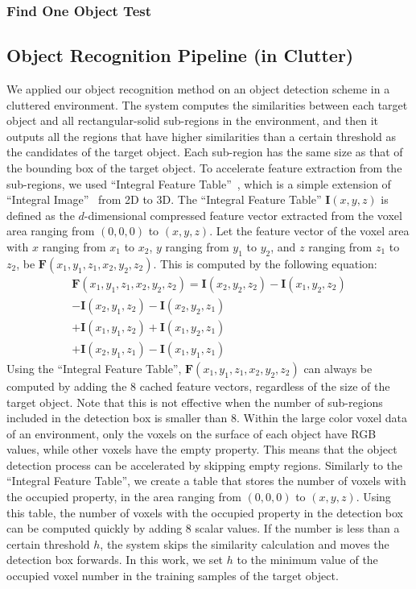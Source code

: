 \documentclass[conference]{sty/IEEEtran}
\begin{document}
\subsubsection{Find One Object Test}

\subsection{Object Recognition Pipeline (in Clutter)}
\label{sec:recognition}
We applied our object recognition method on an object detection scheme in a cluttered environment.
The system computes the similarities between each target object and all rectangular-solid sub-regions in the environment, and then it outputs all the regions that have higher similarities than a certain threshold as the candidates of the target object.
Each sub-region has the same size as that of the bounding box of the target object.
To accelerate feature extraction from the sub-regions, we used ``Integral Feature Table''~\cite{kanezaki2010tvc}, which is a simple extension of ``Integral Image''~\cite{viola2001} from 2D to 3D.
The ``Integral Feature Table'' $\bm{I}(x,y,z)$ is defined as the $d$-dimensional compressed feature vector extracted from the voxel area
    ranging from $(0,0,0)$ to $(x,y,z)$.
Let the feature vector of the voxel area with $x$ ranging from $x_1$ to $x_2$,
    $y$ ranging from $y_1$ to $y_2$, and $z$ ranging from $z_1$ to $z_2$, be $\bm{F}(x_1,y_1,z_1,x_2,y_2,z_2)$.
This is computed by the following equation:
\begin{eqnarray*}\label{eq:sat}
\bm{F}(x_1,y_1,z_1,x_2,y_2,z_2) = \bm{I}(x_2,y_2,z_2) - \bm{I}(x_1,y_2,z_2)
                           \\ - \bm{I}(x_2,y_1,z_2) - \bm{I}(x_2,y_2,z_1)
                           \\ + \bm{I}(x_1,y_1,z_2) + \bm{I}(x_1,y_2,z_1)
                           \\ + \bm{I}(x_2,y_1,z_1) - \bm{I}(x_1,y_1,z_1)
\end{eqnarray*}
Using the ``Integral Feature Table'', $\bm{F}(x_1,y_1,z_1,x_2,y_2,z_2)$ can always be computed by adding the 8 cached feature vectors,
    regardless of the size of the target object.
Note that this is not effective when the number of sub-regions included in the detection box is smaller than 8.
Within the large color voxel data of an environment,
   only the voxels on the surface of each object have RGB values, while other voxels have the empty property.
This means that the object detection process can be accelerated by skipping empty regions.
Similarly to the ``Integral Feature Table'', we create a table that stores
   the number of voxels with the occupied property, in the area ranging from $(0,0,0)$ to $(x,y,z)$.
Using this table, the number of voxels with the occupied property in the detection box can be computed quickly by adding 8 scalar values.
If the number is less than a certain threshold $h$,
   the system skips the similarity calculation and moves the detection box forwards.
In this work, we set $h$ to the minimum value of the occupied voxel number in the training samples of the target object.
\end{document}

